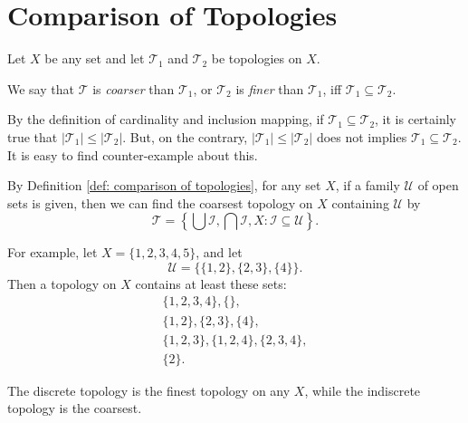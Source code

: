\section{Comparison of Topologies}


\begin{definition}
	\label{def: comparison of topologies}
	Let $X$ be any set and let $\mathcal T_1$ and $\mathcal T_2$ be topologies on $X$.
	
	We say that $\mathcal T$ is \textit{coarser} than $\mathcal T_1$, or $\mathcal T_2$ is \textit{finer} than $\mathcal T_1$, iff $\mathcal T_1 \subseteq \mathcal T_2$.
\end{definition}


\begin{note}
	By the definition of cardinality and inclusion mapping, if $\mathcal T_1 \subseteq \mathcal T_2$, it is certainly true that $| \mathcal T_1 | \le | \mathcal T_2 |$. But, on the contrary, $| \mathcal T_1 | \le |\mathcal T_2|$ does not implies $\mathcal T_1 \subseteq \mathcal T_2$. It is easy to find counter-example about this.
\end{note}


\begin{example}
	By Definition \ref{def: comparison of topologies}, for any set $X$, if a family $\mathcal U$ of open sets is given, then we can find the coarsest topology on $X$ containing $\mathcal U$ by
	$$
	\mathcal T = \left\{ \bigcup \mathcal I, \bigcap \mathcal I, X : \mathcal I \subseteq \mathcal U \right\}.
	$$
	
	For example, let $X = \{1,2,3,4,5\}$, and let
	$$
	\mathcal U = \{\{1,2\}, \{2,3\}, \{4\}\}.
	$$
	Then a topology on $X$ contains at least these sets:
	$$
	\begin{matrix}
		\{1,2,3, 4\}, \{\}, \\
		\{1,2\}, \{2,3\}, \{4\}, \\
		\{1,2,3\}, \{1,2,4\}, \{2,3,4\}, \\
		\{2\}.
	\end{matrix}
	$$
\end{example}


\begin{example}
	The discrete topology is the finest topology on any $X$, while the indiscrete topology is the coarsest.
\end{example}


